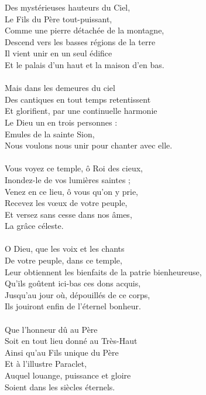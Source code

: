 Des mystérieuses hauteurs du Ciel,\\
Le Fils du Père tout-puissant,\\
Comme une pierre détachée de la montagne,\\
Descend vers les basses régions de la terre\\
Il vient unir en un seul édifice\\
Et le palais d'un haut et la maison d'en bas.\\
\\
Mais dans les demeures du ciel\\
Des cantiques en tout temps retentissent\\
Et glorifient, par une continuelle harmonie\\
Le Dieu un en trois personnes :\\
Emules de la sainte Sion,\\
Nous voulons nous unir pour chanter avec elle.\\
\\
Vous voyez ce temple, ô Roi des cieux,\\
Inondez-le de vos lumières saintes ;\\
Venez en ce lieu, ô vous qu'on y prie,\\
Recevez les vœux de votre peuple,\\
Et versez sans cesse dans nos âmes,\\
La grâce céleste.\\
\\
O Dieu, que les voix et les chants\\
De votre peuple, dans ce temple,\\
Leur obtiennent les bienfaits de la patrie bienheureuse,\\
Qu'ils goûtent ici-bas ces dons acquis,\\
Jusqu'au jour où, dépouillés de ce corps,\\
Ils jouiront enfin de l'éternel bonheur.\\
\\
Que l’honneur dû au Père\\
Soit en tout lieu donné au Très-Haut\\
Ainsi qu’au Fils unique du Père\\
Et à l’illustre Paraclet,\\
Auquel louange, puissance et gloire\\
Soient dans les siècles éternels.